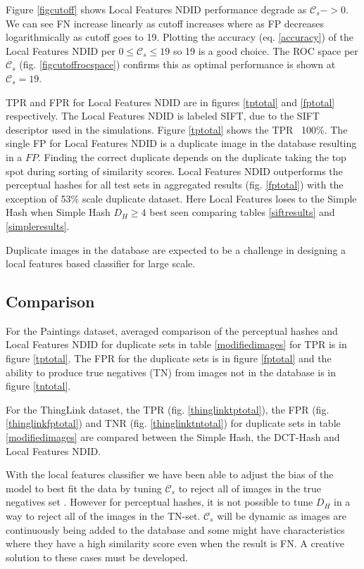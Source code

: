 \documentclass[english,12pt,a4paper,pdftex,elec,utf8, table]{aaltothesis}
\begin{document}
Figure \ref{figcutoff} shows Local Features NDID performance degrade as $\mathcal{C}_{s}->0$. We can see FN increase linearly as cutoff increases where as FP decreases logarithmically as cutoff goes to 19. Plotting the accuracy (eq. \ref{accuracy}) of the Local Features NDID per $0 \leq \mathcal{C}_{s} \leq 19$ so 19 is a good choice. The ROC space per $\mathcal{C}_s$ (fig. \ref{figcutoffrocspace}) confirms this as optimal performance is shown at $\mathcal{C}_s=19$.

TPR and FPR for Local Features NDID are in figures \ref{tptotal} and \ref{fptotal} respectively. The Local Features NDID is labeled SIFT, due to the SIFT descriptor used in the simulations. Figure \ref{tptotal} shows the TPR ~100\%. The single FP for Local Features NDID is a duplicate image in the database resulting in a $FP$. Finding the correct duplicate depends on the duplicate taking the top spot during sorting of similarity scores. Local Features NDID outperforms the perceptual hashes for all test sets in aggregated results (fig. \ref{fptotal}) with the exception of 53\% scale duplicate dataset. Here Local Features loses to the Simple Hash when Simple Hash $D_H \geq 4 $ best seen comparing tables \ref{siftresults} and \ref{simpleresults}.

Duplicate images in the database are expected to be a challenge in designing a local features based classifier for large scale.


\subsection{Comparison}
For the Paintings dataset, averaged comparison of the perceptual hashes and Local Features NDID for duplicate sets in table \ref{modifiedimages} for TPR is in figure \ref{tptotal}. The FPR for the duplicate sets is in figure \ref{fptotal} and the ability to produce true negatives (TN) from images not in the database is in figure \ref{tntotal}.

For the ThingLink dataset, the TPR (fig. \ref{thinglinktptotal}), the FPR (fig. \ref{thinglinkfptotal}) and TNR (fig. \ref{thinglinktntotal}) for duplicate sets in table \ref{modifiedimages} are compared between the Simple Hash, the DCT-Hash and Local Features NDID.

With the local features classifier we have been able to adjust the bias of the model to best fit the data by tuning $\mathcal{C}_s$ to reject all of images in the true negatives set \cite{POWERS2011}. However for perceptual hashes, it is not possible to tune $D_H$ in a way to reject all of the images in the TN-set. $\mathcal{C}_s$ will be dynamic as images are continuously being added to the database and some might have characteristics where they have a high similarity score even when the result is FN. A creative solution to these cases must be developed.
\end{document}
